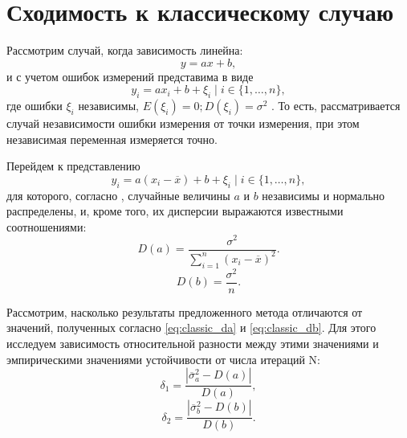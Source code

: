 \documentclass[11pt,a4paper]{article}
\theoremstyle{definition}
\begin{document}

\section{Сходимость к классическому случаю}

Рассмотрим случай, когда зависимость линейна:
\[
  y = ax + b,
\]
и с учетом ошибок измерений представима в виде
\[
  y_i = ax_i + b + \xi_i \mid i \in \{ 1, \dots, n \},
\]
где ошибки $\xi_i$ независимы, $E(\xi_i) = 0; D(\xi_i) = \sigma^2$ \cite{Vatunin05}.
То есть, рассматривается случай независимости ошибки измерения от точки измерения,
при этом независимая переменная измеряется точно.

Перейдем к представлению
\[
  y_i = a(x_i - \overline{x}) + b + \xi_i \mid i \in \{ 1, \dots, n \},
\]
для которого, согласно \cite{Vatunin05}, случайные величины $a$ и $b$ независимы
и нормально распределены, и, кроме того, их дисперсии выражаются известными соотношениями:
\begin{equation}
  \label{eq:classic_da}
  D(a) = \frac{\sigma^2}{\sum_{i = 1}^n (x_i - \overline{x})^2}.
\end{equation}
\begin{equation}
  \label{eq:classic_db}
  D(b) = \frac{\sigma^2}{n}.
\end{equation}

Рассмотрим, насколько результаты предложенного метода отличаются от значений,
полученных согласно \eqref{eq:classic_da} и \eqref{eq:classic_db}. Для этого исследуем
зависимость относительной разности между этими значениями и эмпирическими значениями устойчивости от
числа итераций N:
\[
  \delta_1 = \frac{| \overline{\sigma}_a^2 - D(a) |}{D(a)},
\]
\[
  \delta_2 = \frac{| \overline{\sigma}_b^2 - D(b) |}{D(b)}.
\]
\end{document}
